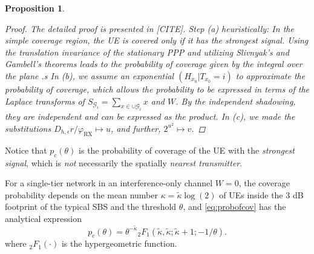 \documentclass[conference]{IEEEtran}
\theoremstyle{definition}
\theoremstyle{plain}
\newtheorem{prop}[thm4]{Proposition}
\begin{document}
\begin{prop}
            \begin{proof}
              The detailed proof is presented in [CITE]. Step (a) heuristically: In the simple coverage region, the UE is covered \textit{only if} it has the strongest signal. Using the translation invariance of the stationary PPP and utilizing Slivnyak's and Gambell's theorems leads to the probability of coverage given by the integral over the plane
.s
              In (b), we assume an exponential $(H_{x_0}|T_{x_0}=i)$ to approximate the probability of coverage, which allows the probability to be expressed in terms of the Laplace transforms of $S_{\mathcal{G}_i} = \sum_{x \in \cup \mathcal{G}_i}x$ and $W$. By the independent shadowing, they are independent and can be expressed as the product. In (c), we made the substitutions $D_{h,\epsilon}r/\varphi_{\text{RX}} \mapsto u$, and further, $2^{u^2} \mapsto v$.
              
            \end{proof}
          \end{prop}
          Notice that $p_c(\theta)$ is the probability of coverage of the UE with the \textit{strongest signal}, which is \textit{not} necessarily the spatially  \textit{nearest transmitter}.

          For a single-tier network in an interference-only channel $W=0$, the coverage probability depends on the mean number $\kappa = \tilde{\kappa} \log(2)$ of UEs inside the  $3$ dB footprint of the typical SBS and the threshold $\theta$, and \eqref{eq:probofcov} has the analytical expression
          \begin{equation}
p_c(\theta) =  \theta^{-\tilde{\kappa}} {_2F_1}\left(\tilde{\kappa}, \tilde{\kappa};\tilde{\kappa} + 1; -1/\theta \right).
          \end{equation}
          where $_2F_1(\cdot)$ is the hypergeometric function. 
\end{document}
